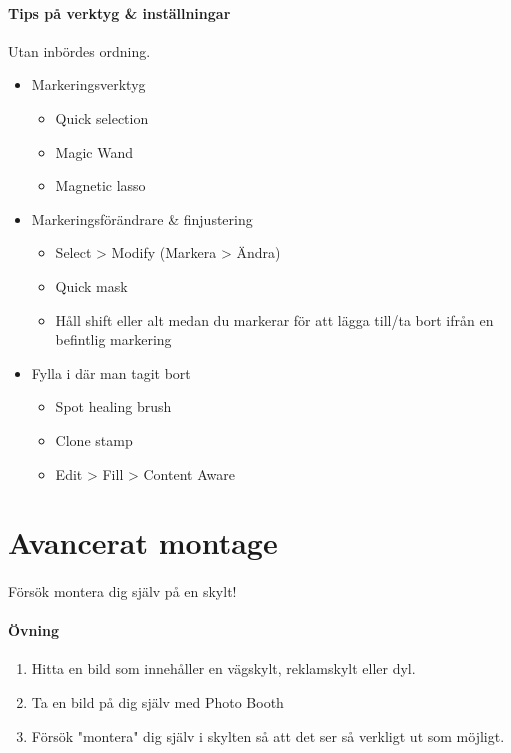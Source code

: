 \documentclass{article}
\begin{document}
    \paragraph{Tips på verktyg \& inställningar}
      Utan inbördes ordning.
      \begin{itemize}
        \item Markeringsverktyg
          \begin{itemize}
            \item Quick selection
            \item Magic Wand
            \item Magnetic lasso
          \end{itemize}
        \item Markeringsförändrare \& finjustering
          \begin{itemize}
            \item Select > Modify (Markera > Ändra)
            \item Quick mask
            \item Håll shift eller alt medan du markerar för att lägga till/ta bort ifrån en befintlig markering
          \end{itemize}
        \item Fylla i där man tagit bort
          \begin{itemize}
            \item Spot healing brush
            \item Clone stamp
            \item Edit > Fill > Content Aware
          \end{itemize}
      \end{itemize}


      
  \section{ Avancerat montage }
    \paragraph{}
      Försök montera dig själv på en skylt!
    \paragraph{Övning}
      \begin{enumerate}
        \item Hitta en bild som innehåller en vägskylt, reklamskylt eller dyl.
        \item Ta en bild på dig själv med Photo Booth
        \item Försök "montera" dig själv i skylten så att det ser så verkligt ut som möjligt.
      \end{enumerate}
\end{document}
